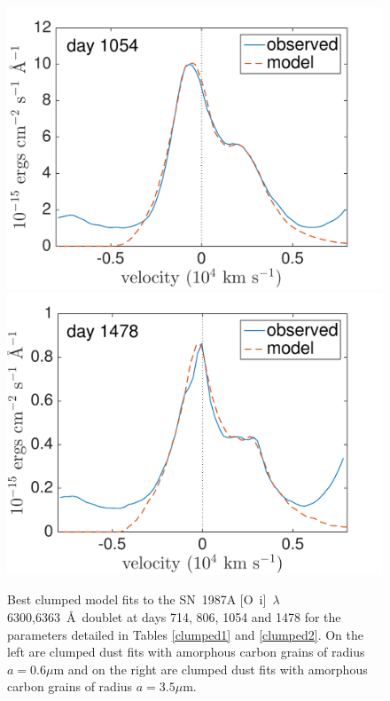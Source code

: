 \begin{figure}
\includegraphics[trim =0 0 0 0,clip=true,scale=0.37]{chapters/chapter5/images/clump_1/maximum/d1054OI.pdf}
\hspace{0mm}
\includegraphics[trim =0 0 0 0,clip=true,scale=0.37]{chapters/chapter5/images/clump_1/maximum/d1478OI_new.pdf}


\caption{Best clumped model fits to the SN~1987A [O~{\sc i}]~$\lambda$6300,6363~\AA\ doublet at days 714, 806, 1054 and 1478 for the parameters detailed in Tables \ref{clumped1} and \ref{clumped2}.  On the left are clumped dust fits with amorphous carbon grains of radius $a=0.6 \mu$m and on the right are clumped dust fits with amorphous carbon grains of radius $a=3.5 \mu$m.}
\label{OI_smooth_c}

\end{figure}

